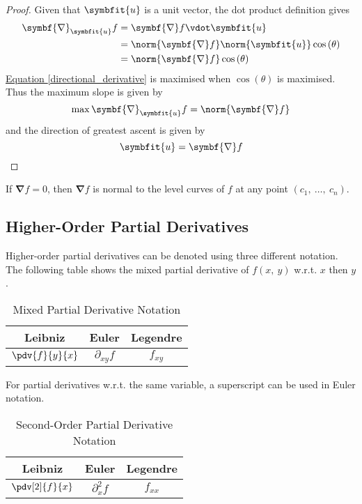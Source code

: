 \documentclass{article}
\begin{document}
\begin{proof}
    Given that $\symbfit{u}$ is a unit vector, the dot product definition
    gives
    \begin{align}
        \symbf{\nabla}_{\symbfit{u}}f &= \symbf{\nabla}f \vdot \symbfit{u} \nonumber \\
        &= \norm{\symbf{\nabla}f} \norm{\symbfit{u}} \cos{\left( \theta \right)} \nonumber \\
        &= \norm{\symbf{\nabla}f} \cos{\left( \theta \right)} \label{directional_derivative}
    \end{align}
    \hyperref[directional_derivative]{Equation \ref{directional_derivative}} is
    maximised when $\cos{\left( \theta \right)}$ is maximised. Thus the
    maximum slope is given by
    \begin{equation*}
        \max \symbf{\nabla}_{\symbfit{u}}f = \norm{\symbf{\nabla}f}
    \end{equation*}
    and the direction of greatest ascent is given by
    \begin{equation*}
        \symbfit{u} = \symbf{\nabla}f
    \end{equation*}
\end{proof}
\begin{theorem}
    If $\symbf{\nabla}f = 0$, then $\symbf{\nabla}f$ is normal to the level
    curves of $f$ at any point $(c_1,\: \ldots,\: c_n)$.
\end{theorem}
\subsection{Higher-Order Partial Derivatives}
\begin{definition}
    Higher-order partial derivatives can be denoted using three different
    notation. The following table shows the mixed partial derivative of
    $f(x,\: y)$ w.r.t. $x$ then $y$.
    \begin{table}[H]
        \centering
        \begin{tabular}{c c c}
            \toprule
            \textbf{Leibniz} & \textbf{Euler} & \textbf{Legendre} \\
            \midrule
            $\displaystyle\pdv{f}{y}{x}$ & $\partial_{x y}{f}$ & $f_{x y}$ \\
            \bottomrule
        \end{tabular}
        \caption{Mixed Partial Derivative Notation}
    \end{table}
    For partial derivatives w.r.t. the same variable, a superscript can be used
    in Euler notation.
    \begin{table}[H]
        \centering
        \begin{tabular}{c c c}
            \toprule
            \textbf{Leibniz} & \textbf{Euler} & \textbf{Legendre} \\
            \midrule
            $\displaystyle\pdv[2]{f}{x}$ & $\partial^2_{x}{f}$ & $f_{x x}$ \\
            \bottomrule
        \end{tabular}
        \caption{Second-Order Partial Derivative Notation}
    \end{table}
\end{definition}
\end{document}
